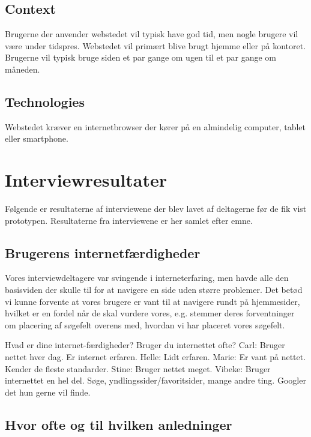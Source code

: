\documentclass[a4paper, 12pt]{article}
\begin{document}
\subsection{Context}

Brugerne der anvender webstedet vil typisk have god tid, men nogle brugere vil
være under tidspres. Webstedet vil primært blive brugt hjemme eller på kontoret.
Brugerne vil typisk bruge siden et par gange om ugen til et par gange om
måneden.

\subsection{Technologies}

Webstedet kræver en internetbrowser der kører på en almindelig computer, tablet
eller smartphone.

\section{Interviewresultater}
\label{sec:Interviewresultater}
Følgende er resultaterne af interviewene der blev lavet af deltagerne før de fik vist prototypen.
Resultaterne fra interviewene er her samlet efter emne.

\subsection{Brugerens internetfærdigheder}

Vores interviewdeltagere var svingende i interneterfaring, men havde alle den basisviden
der skulle til for at navigere en side uden større problemer. Det betød vi kunne
forvente at vores brugere er vant til at navigere rundt på hjemmesider, hvilket
er en fordel når de skal vurdere vores, e.g. stemmer deres forventninger om
placering af søgefelt overens med, hvordan vi har placeret vores søgefelt.


  Hvad er dine internet-færdigheder? Bruger du internettet ofte?
    Carl: Bruger nettet hver dag. Er internet erfaren.
    Helle: Lidt erfaren.
    Marie: Er vant på nettet. Kender de fleste standarder.  
    Stine: Bruger nettet meget.
    Vibeke: Bruger internettet en hel del. Søge, yndlingssider/favoritsider, mange andre
	    ting. Googler det hun gerne vil finde.

\subsection{Hvor ofte og til hvilken anledninger}
\end{document}
